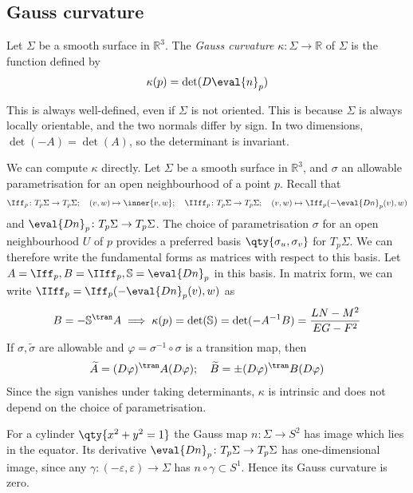 \subsection{Gauss curvature}
\begin{definition}
	Let $\Sigma$ be a smooth surface in $\mathbb R^3$.
	The \textit{Gauss curvature} $\kappa \colon \Sigma \to \mathbb R$ of $\Sigma$ is the function defined by
	\begin{align*}
		\kappa(p) = \det(D \eval{n}_p)
	\end{align*}
\end{definition}
\begin{remark}
	This is always well-defined, even if $\Sigma$ is not oriented.
	This is because $\Sigma$ is always locally orientable, and the two normals differ by sign.
	In two dimensions, $\det(-A) = \det(A)$, so the determinant is invariant.
\end{remark}
We can compute $\kappa$ directly.
Let $\Sigma$ be a smooth surface in $\mathbb R^3$, and $\sigma$ an allowable parametrisation for an open neighbourhood of a point $p$.
Recall that
\begin{align*}
	\Iff_p \colon T_p \Sigma \to T_p \Sigma;\quad (v,w) \mapsto \inner{v,w};\quad \IIff_p \colon T_p \Sigma \to T_p \Sigma;\quad (v,w) \mapsto \Iff_p(-\eval{Dn}_p(v), w)
\end{align*}
and $\eval{Dn}_p \colon T_p \Sigma \to T_p \Sigma$.
The choice of parametrisation $\sigma$ for an open neighbourhood $U$ of $p$ provides a preferred basis $\qty{\sigma_u, \sigma_v}$ for $T_p \Sigma$.
We can therefore write the fundamental forms as matrices with respect to this basis.
Let $A = \Iff_p, B = \IIff_p, \mathbb S = \eval{Dn}_p$ in this basis.
In matrix form, we can write $\IIff_p = \Iff_p(-\eval{Dn}_p(v),w)$ as
\begin{align*}
	B = -\mathbb S^\tran A \implies \kappa(p) = \det(\mathbb S) = \det(-A^{-1}B) = \frac{LN-M^2}{EG-F^2}
\end{align*}
If $\sigma, \widetilde \sigma$ are allowable and $\varphi = \sigma^{-1} \circ \sigma$ is a transition map, then
\begin{align*}
	\widetilde A = (D\varphi)^\tran A (D \varphi);\quad \widetilde B = \pm (D\varphi)^\tran B (D \varphi)
\end{align*}
Since the sign vanishes under taking determinants, $\kappa$ is intrinsic and does not depend on the choice of parametrisation.
\begin{example}
	For a cylinder $\qty{x^2 + y^2 = 1}$ the Gauss map $n \colon \Sigma \to S^2$ has image which lies in the equator.
	Its derivative $\eval{Dn}_p \colon T_p \Sigma \to T_p \Sigma$ has one-dimensional image, since any $\gamma \colon (-\varepsilon, \varepsilon) \to \Sigma$ has $n \circ \gamma \subset S^1$.
	Hence its Gauss curvature is zero.
\end{example}
